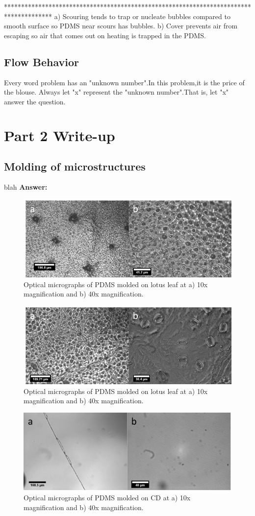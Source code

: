 \documentclass[12pt]{article}%
\begin{document}
**************************************************************************************
a)	Scouring tends to trap or nucleate bubbles compared to smooth surface so PDMS near scours has bubbles.
b)	Cover prevents air from escaping so air that comes out on heating is trapped in the PDMS.

\subsection{Flow Behavior}
Every word problem has an "unknown number".In this problem,it is the price of the blouse. Always let "x" represent the "unknown number".That is, let "x" answer the question.

\section{Part 2 Write-up}
\subsection {Molding of microstructures}
blah
\newline
\textbf{Answer:}
\newline
\begin{figure} [ht]
\centering
\includegraphics[width=.5\textwidth]{lotus.png}
\caption{\label{fig:lotus}Optical micrographs of PDMS molded on lotus leaf at a) 10x magnification and b) 40x magnification.}
\end{figure}

\begin{figure} [ht]
\centering
\includegraphics[width=.5\textwidth]{oak.png}
\caption{\label{fig:oak leaf}Optical micrographs of PDMS molded on lotus leaf at a) 10x magnification and b) 40x magnification.}
\end{figure}

\begin{figure} [ht]
\centering
\includegraphics[width=.5\textwidth]{cd.png}
\caption{\label{fig:cd}Optical micrographs of PDMS molded on CD at a) 10x magnification and b) 40x magnification.}
\end{figure}
\end{document}

